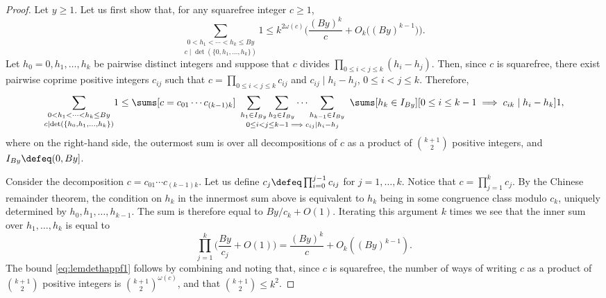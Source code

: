 \documentclass[12pt, reqno, twoside, letterpaper]{amsart}
\begin{document}
\begin{proof}
%
Let $y \ge 1$.
%
Let us first show that, for any squarefree integer $c \ge 1$, 
\begin{equation}
 \label{eq:lemdethappf1}
 \underset{c \mid \det(\{0,h_1,\ldots,h_k\})}
  { 
   \sum_{0 < h_1 < \cdots < h_k \le By}
  } 1
  \le  
   k^{2\omega(c)}
    \bigg(\frac{(By)^k}{c} + O_k\big((By)^{k - 1}\big)\bigg).
\end{equation}
%
Let $h_0 = 0,h_1,\ldots,h_k$ be pairwise distinct integers and  
suppose that $c$ divides $\prod_{0 \le i < j \le k}(h_i - h_j)$.
%
Then, since $c$ is squarefree, there exist pairwise coprime 
positive integers $c_{ij}$ such that 
$c = \prod_{0 \le i < j \le k} c_{ij}$ and 
$c_{ij} \mid h_i - h_j$, $0 \le i < j \le k$.
%
Therefore, 
\[
 \underset{c \mid \det(\{h_0,h_1,\ldots,h_k\})}
  { 
   \sum_{0 < h_1 < \cdots < h_k \le By}
  } 1
   \le 
    \sums[c = c_{01}\cdots c_{(k-1)k}] 
     \hspace{5pt}
     \underset{0 \le i < j \le k - 1 \implies c_{ij} \mid h_i - h_j}
    { 
       \sum_{h_1 \in I_{By}}
        \sum_{h_2 \in I_{By}}
         \cdots 
          \sum_{h_{k - 1} \in I_{By}}
    } 
     \hspace{5pt}
      \sums[h_k \in I_{By}][0 \le i \le k - 1 \implies c_{ik} \mid h_i - h_k] 1,
\]
where on the right-hand side, the outermost sum is over all 
decompositions of $c$ as a product of $\binom{k + 1}{2}$ positive 
integers, and $I_{By} \defeq (0,By]$.

Consider the decomposition $c = c_{01}\cdots c_{(k - 1)k}$.
%
Let us define $c_{j} \defeq \prod_{i = 0}^{j - 1} c_{ij}$ for 
$j = 1,\ldots,k$.
%
Notice that $c = \prod_{j = 1}^k c_j$.
%
By the Chinese remainder theorem, the condition on $h_k$ in the 
innermost sum above is equivalent to $h_k$ being in some 
congruence class modulo $c_k$, uniquely determined by 
$h_0,h_1,\ldots,h_{k - 1}$.
%
The sum is therefore equal to $By/c_k + O(1)$.
%
Iterating this argument $k$ times we see that the inner sum over 
$h_1,\ldots,h_k$ is equal to  
\[
  \prod_{j = 1}^k
   \bigg(\frac{By}{c_j} + O(1)\bigg)
    =
     \frac{(By)^k}{c} + O_k((By)^{k - 1}).
\]
%
The bound \eqref{eq:lemdethappf1} follows by combining and noting 
that, since $c$ is squarefree, the number of ways of writing $c$ 
as a product of $\binom{k + 1}{2}$ positive integers is 
$\binom{k + 1}{2}^{\omega(c)}$, and that 
$\binom{k + 1}{2} \le k^2$.


\end{proof}
\end{document}
